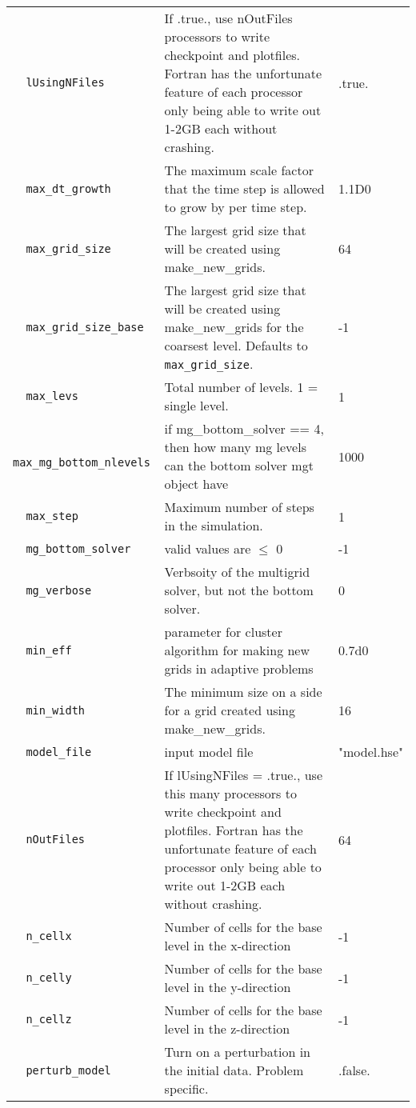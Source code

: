 {\begin{center}
\begin{longtable}{|l|p{3.25in}|l|}
\verb=  lUsingNFiles  = &   If .true., use nOutFiles processors to write checkpoint and plotfiles. Fortran has the unfortunate feature of each processor only being able to write out 1-2GB each without crashing.  &  .true. \\
\verb=  max_dt_growth  = &   The maximum scale factor that the time step is allowed to grow by per time step.  &  1.1D0 \\
\verb=  max_grid_size  = &   The largest grid size that will be created using make\_new\_grids.  &  64 \\
\verb=  max_grid_size_base  = &   The largest grid size that will be created using make\_new\_grids for the coarsest level.  Defaults to {\tt max\_grid\_size}.  &  -1 \\
\verb=  max_levs  = &   Total number of levels.  1 = single level.  &  1 \\
\verb=  max_mg_bottom_nlevels  = &   if mg\_bottom\_solver == 4, then how many mg levels can the bottom solver mgt object have  &  1000 \\
\verb=  max_step  = &   Maximum number of steps in the simulation.  &  1 \\
\verb=  mg_bottom_solver  = &   valid values are $\le$ 0  &  -1 \\
\verb=  mg_verbose  = &   Verbsoity of the multigrid solver, but not the bottom solver.  &  0 \\
\verb=  min_eff  = &   parameter for cluster algorithm for making new grids in adaptive problems  &  0.7d0 \\
\verb=  min_width  = &   The minimum size on a side for a grid created using make\_new\_grids.  &  16 \\
\verb=  model_file  = &   input model file  &  "model.hse" \\
\verb=  nOutFiles  = &   If lUsingNFiles = .true., use this many processors to write checkpoint and plotfiles.  Fortran has the unfortunate feature of each processor only being able to write out 1-2GB each without crashing.  &  64 \\
\verb=  n_cellx  = &   Number of cells for the base level in the x-direction  &  -1 \\
\verb=  n_celly  = &   Number of cells for the base level in the y-direction  &  -1 \\
\verb=  n_cellz  = &   Number of cells for the base level in the z-direction  &  -1 \\
\verb=  perturb_model  = &   Turn on a perturbation in the initial data.  Problem specific.  &  .false. \\

\end{longtable}
\end{center}}
